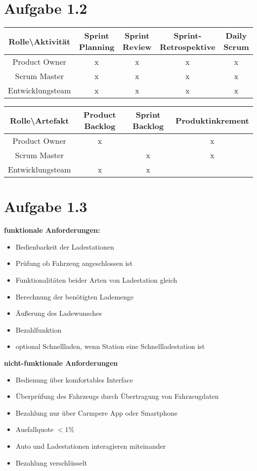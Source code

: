 \documentclass[a4paper,11pt]{scrartcl}
\begin{document}
\newpage

	\section*{Aufgabe 1.2}
	
	\begin{table}[h!]
		\begin{tabular}{c|c|c|c|c}
		 \textbf{Rolle\textbackslash Aktivität} & Sprint Planning & Sprint Review & Sprint-Retrospektive & Daily Scrum \\
		 \hline
		 Product Owner		&x &x &x &x \\
		 Scrum Master		&x &x &x &x \\
		 Entwicklungsteam	&x &x &x &x \\
		\end{tabular}
	\end{table}
	
	\begin{table}[h!]
		\begin{tabular}{c|c|c|c}
		 \textbf{Rolle\textbackslash Artefakt} & Product Backlog & Sprint Backlog & Produktinkrement \\
		 \hline
		 Product Owner		&x &  &x \\
		 Scrum Master		&  &x &x \\
		 Entwicklungsteam	&x &x &  \\
		\end{tabular}
	\end{table}
	
	\section*{Aufgabe 1.3}
	\textbf{funktionale Anforderungen:}
	\begin{itemize}
		\item Bedienbarkeit der Ladestationen
		\item Prüfung ob Fahrzeug angeschlossen ist
		\item Funktionalitäten beider Arten von Ladestation gleich
		\item Berechnung der benötigten Lademenge
		\item Äußerung des Ladewunsches
		\item Bezahlfunktion
		\item optional Schnellladen, wenn Station eine Schnellladestation ist
	\end{itemize}
	\textbf{nicht-funktionale Anforderungen}
	\begin{itemize}
		\item Bedienung über komfortables Interface
		\item Überprüfung des Fahrzeugs durch Übertragung von Fahrzeugdaten
		\item Bezahlung nur über Carmpere App oder Smartphone
		\item Ausfallquote $< 1\%$
		\item Auto und Ladestationen interagieren miteinander
		\item Bezahlung verschlüsselt
	\end{itemize}
	
	
\end{document}
